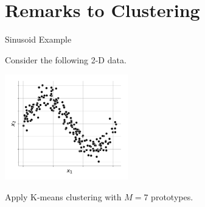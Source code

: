 \section{Remarks to Clustering}


\begin{frame}{Sinusoid Example}

Consider the following 2-D data.

\begin{center}
	\includegraphics[width=0.4\textwidth]{img/sin_data}
\end{center}

\pause

Apply K-means clustering with $M=7$ prototypes.

\end{frame}

